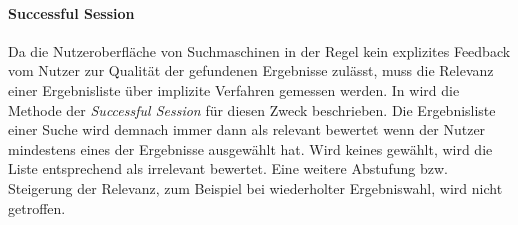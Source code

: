 \paragraph{Successful Session}\label{sec:successfulsession} Da die Nutzeroberfläche von Suchmaschinen in der Regel kein explizites Feedback vom Nutzer zur Qualität der gefundenen Ergebnisse  zulässt, muss die Relevanz einer Ergebnisliste über implizite Verfahren gemessen werden. In \citep{smyth05a} wird die Methode der \textit{Successful Session} für diesen Zweck beschrieben. Die Ergebnisliste einer Suche wird demnach immer dann als relevant bewertet wenn der Nutzer mindestens eines der Ergebnisse ausgewählt hat. Wird keines gewählt, wird die Liste entsprechend als irrelevant bewertet. Eine weitere Abstufung bzw. Steigerung der Relevanz, zum Beispiel bei wiederholter Ergebniswahl, wird nicht getroffen. \citep{smyth05a} 
